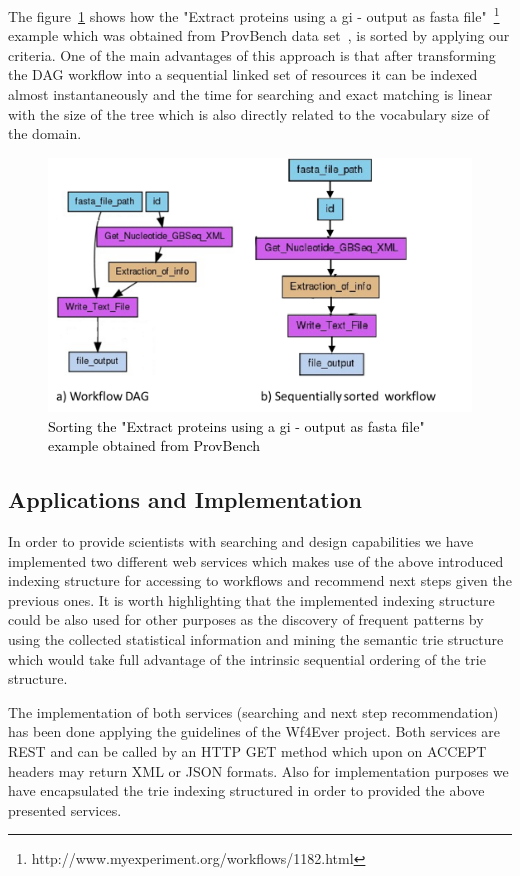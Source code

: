The figure~\ref{fig:sorting-workflow} shows how the "Extract proteins using a gi - output as fasta file"~\footnote{http://www.myexperiment.org/workflows/1182.html} example which was obtained from ProvBench data set~\cite{khalid_13}, is sorted by applying our criteria. One of the main advantages of this approach is that after transforming the DAG workflow into a sequential linked set of resources it can be indexed almost instantaneously and the time for searching and exact matching is linear with the size of the tree which is also directly related to the vocabulary size of the domain.

\begin{figure}[ht!]
\centering
\includegraphics[scale=0.70]{Figures/sorting-workflow.png}
\caption{\textcolor{black}{Sorting the "Extract proteins using a gi - output as fasta file" example obtained from ProvBench}}
\label{fig:sorting-workflow}
\end{figure}

\subsection{Applications and Implementation}
In order to provide scientists with searching and design capabilities we have implemented two different web services which makes use of the above introduced indexing structure for accessing to workflows and recommend next steps given the previous ones. It is worth highlighting that the implemented indexing structure could be also used for other purposes as the discovery of frequent patterns by using the collected statistical information and mining the semantic trie structure which would take full advantage of the intrinsic sequential ordering of the trie structure. 

The implementation of both services (searching and next step recommendation) has been done applying the guidelines of the Wf4Ever project. Both services are REST and can be called by an HTTP GET method which upon on ACCEPT headers may return XML or JSON formats. Also for implementation purposes we have encapsulated the trie indexing structured in order to provided the above presented services.
 
